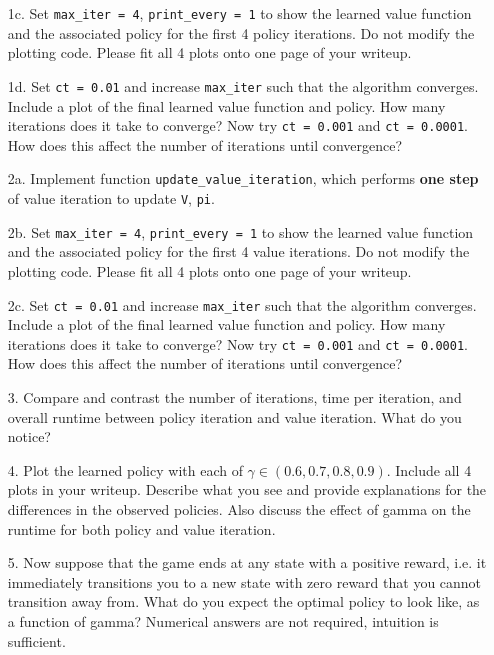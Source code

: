 \documentclass[submit]{harvardml}
\begin{document}
\begin{framed}
\begin{itemize}
    \item[1c.] Set \texttt{max\_iter = 4}, \texttt{print\_every = 1} to show the learned value function and the associated policy for the first 4 policy iterations. Do not modify the plotting code. Please fit all 4 plots onto one page of your writeup.
    
    \item [1d.] Set \texttt{ct = 0.01} and increase \texttt{max\_iter} such that the algorithm converges. Include a plot of the final learned value function and policy. How many iterations does it take to converge? Now try \texttt{ct = 0.001} and \texttt{ct = 0.0001}. How does this affect the number of iterations until convergence?
      
    \item [2a.] Implement function
      \texttt{update\_value\_iteration}, which performs \textbf{one step} of value iteration to update \texttt{V}, \texttt{pi}.
      
    \item [2b.] Set \texttt{max\_iter = 4}, \texttt{print\_every = 1} to show the learned value function and the associated policy for the first 4 value iterations. Do not modify the plotting code. Please fit all 4 plots onto one page of your writeup.
    
    \item [2c.] Set \texttt{ct = 0.01} and increase \texttt{max\_iter} such that the algorithm converges. Include a plot of the final learned value function and policy. How many iterations does it take to converge? Now try \texttt{ct = 0.001} and \texttt{ct = 0.0001}. How does this affect the number of iterations until convergence?
    
    \item[3.] Compare and contrast the number of iterations, time per iteration, and overall runtime between policy iteration and value iteration. What do you notice?
    
    \item[4.] Plot the learned policy with each of $\gamma \in (0.6,0.7,0.8,0.9)$. Include all 4 plots in your writeup. Describe what you see and provide explanations for the differences in the observed policies. Also discuss the effect of gamma on the runtime for both policy and value iteration.
    
    \item[5.] Now suppose that the game ends at any state with a positive reward, i.e. it immediately transitions you to a new state with zero reward that you cannot transition away from. What do you expect the optimal policy to look like, as a function of gamma? Numerical answers are not required, intuition is sufficient.
 
\end{itemize}
\end{framed}
\end{document}
